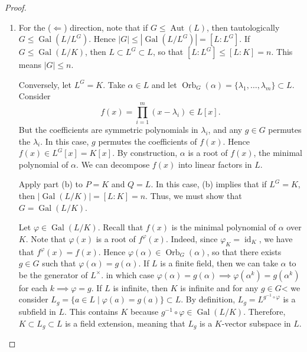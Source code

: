 \documentclass[10pt,letterpaper,cm]{nupset}
\theoremstyle{definition}
\theoremstyle{theorem}
\theoremstyle{remark}
\newcommand{\1}{\mathbf{1}}
\newcommand{\0}{\vec 0}
\DeclareMathOperator{\id}{id}
\DeclareMathOperator{\gal}{Gal}
\DeclareMathOperator{\aut}{Aut}
\DeclareMathOperator{\orb}{Orb}
\begin{document}
\begin{proof} $ $
\begin{enumerate}[label=(\alph*)]
\item For the ($\Longleftarrow$) direction, note that if $G \leq \aut(L)$, then tautologically $G \leq \gal(L/L^G)$. Hence $|G| \leq |\gal(L/L^G)| = [L: L^G]$. If $G \leq \gal(L/K)$, then $L \subset L^G \subset L$, so that $[L:L^G]\leq [L:K] =n$. This means $|G|\leq n$.

Conversely, let $L^G =K$.  Take $\alpha \in L$ and let $\orb_G(\alpha) = \{\lambda_1, \ldots, \lambda_m\} \subset L$. Consider $$f(x) = \prod_{i=1}^m (x-\lambda_i) \in L[x].$$ But the coefficients are symmetric polynomials in $\lambda_i$, and any $g\in G$ permutes the $\lambda_i$. In this case, $g$ permutes the coefficients of $f(x)$. Hence $f(x) \in L^G[x] = K[x]$. By construction, $\alpha$ is a root of $f(x)$, the minimal polynomial of $\alpha$.  We can decompose $f(x)$ into linear factors in $L$.

Apply part (b) to $P = K$ and $Q=L$. In this case, (b) implies that if $L^G=K$, then $\lvert{\gal(L/K)}\rvert = [L:K]=n$. Thus, we must show that $G = \gal(L/K)$.

Let $\varphi \in \gal(L/K)$. Recall that $f(x)$ is the minimal polynomial of $\alpha$ over $K$. Note that $\varphi(x)$ is a root of $f^{\varphi}(x)$. Indeed, since $\varphi_K = \id_K$, we have that $f^{\varphi}(x) = f(x)$. Hence $\varphi(\alpha) \in \orb_G(\alpha)$, so that there exists $g\in G$ such that $\varphi(\alpha) = g(\alpha)$. If $L$ is a finite field, then we can take $\alpha$ to be the generator of $L^{\times}$. in which case $\varphi(\alpha) = g(\alpha) \implies \varphi(\alpha^k)= g(\alpha^k)$ for each $k \implies \varphi = g.$ If $L$ is infinite, then $K$ is infinite and for any $g\in G$< we consider $L_g = \{a\in L \mid \varphi(a) = g(a)\}\subset L$. By definition, $L_g = L^{g^{-1}\circ \varphi}$ is a subfield in $L$. This contains $K$ because $g^{-1}\circ \varphi \in \gal(L/K)$. Therefore, $K\subset L_g \subset L$ is a field extension, meaning that $L_g$ is a $K$-vector subspace in $L$.


\end{enumerate}
\end{proof}
\end{document}
